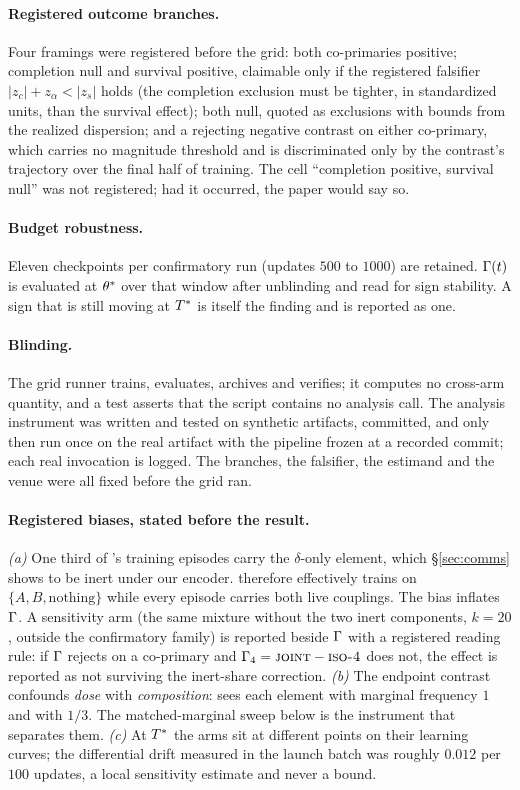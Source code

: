 \paragraph{Registered outcome branches.} Four framings were registered before
the grid: both co-primaries positive; completion null and survival positive,
claimable only if the registered falsifier $|z_c| + z_\alpha < |z_s|$ holds
(the completion exclusion must be tighter, in standardized units, than the
survival effect); both null, quoted as exclusions with bounds from the
realized dispersion; and a rejecting negative contrast on either co-primary,
which carries no magnitude threshold and is discriminated only by the
contrast's trajectory over the final half of training. The cell ``completion
positive, survival null'' was not registered; had it occurred, the paper
would say so.

\paragraph{Budget robustness.} Eleven checkpoints per confirmatory run
(updates $500$ to $1000$) are retained. $\Gamma(t)$ is evaluated at $\theta^{\ast}$
over that window after unblinding and read for sign stability. A sign that is
still moving at $T^{\ast}$ is itself the finding and is reported as one.

\paragraph{Blinding.} The grid runner trains, evaluates, archives and
verifies; it computes no cross-arm quantity, and a test asserts that the
script contains no analysis call. The analysis instrument was written and
tested on synthetic artifacts, committed, and only then run once on the real
artifact with the pipeline frozen at a recorded commit; each real invocation
is logged. The branches, the falsifier, the estimand and the venue were all
fixed before the grid ran.

\paragraph{Registered biases, stated before the result.}
\emph{(a)} One third of \ISO's training episodes carry the $\delta$-only
element, which \S\ref{sec:comms} shows to be inert under our encoder. \ISO{}
therefore effectively trains on $\{A, B, \text{nothing}\}$ while every
\JOINT{} episode carries both live couplings. The bias inflates $\Gamma$. A
sensitivity arm \ISOfour{} (the same mixture without the two inert
components, $k = 20$, outside the confirmatory family) is reported beside
$\Gamma$ with a registered reading rule: if $\Gamma$ rejects on a co-primary and
$\Gamma_4 = \textsc{joint} - \textsc{iso-4}$ does not, the effect is reported as not
surviving the inert-share correction.
\emph{(b)} The endpoint contrast confounds \emph{dose} with
\emph{composition}: \JOINT{} sees each element with marginal frequency $1$
and \ISO{} with $1/3$. The matched-marginal sweep below is the instrument
that separates them.
\emph{(c)} At $T^{\ast}$ the arms sit at different points on their learning
curves; the differential drift measured in the launch batch was roughly
$0.012$ per $100$ updates, a local sensitivity estimate and never a bound.

